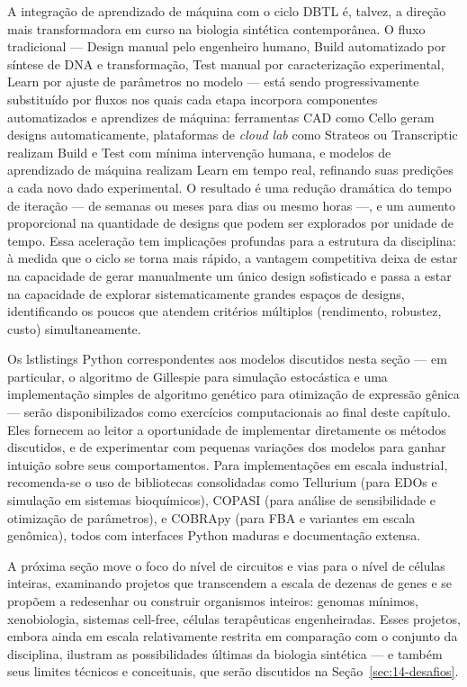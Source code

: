 A integração de aprendizado de máquina com o ciclo DBTL é, talvez, a direção mais transformadora em curso na biologia sintética contemporânea. O fluxo tradicional --- Design manual pelo engenheiro humano, Build automatizado por síntese de DNA e transformação, Test manual por caracterização experimental, Learn por ajuste de parâmetros no modelo --- está sendo progressivamente substituído por fluxos nos quais cada etapa incorpora componentes automatizados e aprendizes de máquina: ferramentas CAD como Cello geram designs automaticamente, plataformas de \emph{cloud lab} como Strateos ou Transcriptic realizam Build e Test com mínima intervenção humana, e modelos de aprendizado de máquina realizam Learn em tempo real, refinando suas predições a cada novo dado experimental. O resultado é uma redução dramática do tempo de iteração --- de semanas ou meses para dias ou mesmo horas ---, e um aumento proporcional na quantidade de designs que podem ser explorados por unidade de tempo. Essa aceleração tem implicações profundas para a estrutura da disciplina: à medida que o ciclo se torna mais rápido, a vantagem competitiva deixa de estar na capacidade de gerar manualmente um único design sofisticado e passa a estar na capacidade de explorar sistematicamente grandes espaços de designs, identificando os poucos que atendem critérios múltiplos (rendimento, robustez, custo) simultaneamente.

Os lstlistings Python correspondentes aos modelos discutidos nesta seção --- em particular, o algoritmo de Gillespie para simulação estocástica e uma implementação simples de algoritmo genético para otimização de expressão gênica --- serão disponibilizados como exercícios computacionais ao final deste capítulo. Eles fornecem ao leitor a oportunidade de implementar diretamente os métodos discutidos, e de experimentar com pequenas variações dos modelos para ganhar intuição sobre seus comportamentos. Para implementações em escala industrial, recomenda-se o uso de bibliotecas consolidadas como Tellurium (para EDOs e simulação em sistemas bioquímicos), COPASI (para análise de sensibilidade e otimização de parâmetros), e COBRApy (para FBA e variantes em escala genômica), todos com interfaces Python maduras e documentação extensa.

A próxima seção move o foco do nível de circuitos e vias para o nível de células inteiras, examinando projetos que transcendem a escala de dezenas de genes e se propõem a redesenhar ou construir organismos inteiros: genomas mínimos, xenobiologia, sistemas cell-free, células terapêuticas engenheiradas. Esses projetos, embora ainda em escala relativamente restrita em comparação com o conjunto da disciplina, ilustram as possibilidades últimas da biologia sintética --- e também seus limites técnicos e conceituais, que serão discutidos na Seção~\ref{sec:14-desafios}.



